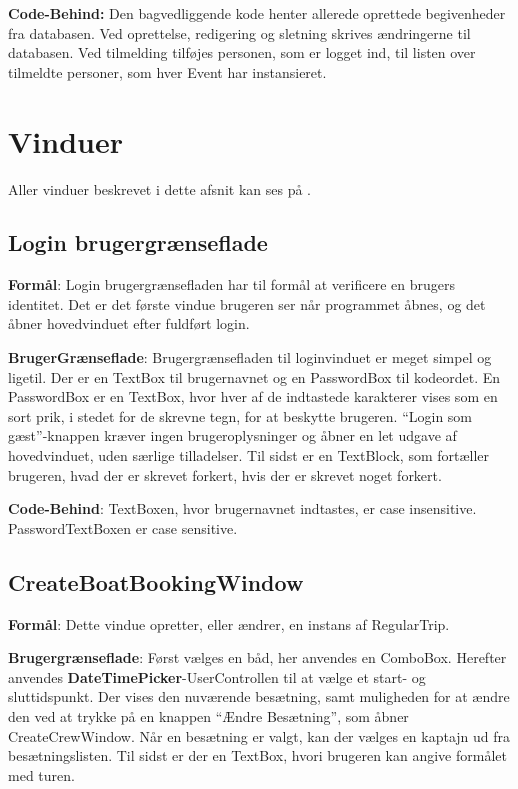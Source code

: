 \textbf{Code-Behind:}
Den bagvedliggende kode henter allerede oprettede begivenheder fra databasen. 
Ved oprettelse, redigering og sletning skrives ændringerne til databasen. 
Ved tilmelding tilføjes personen, som er logget ind, til listen over tilmeldte personer, som hver Event har instansieret. 

\section{Vinduer}
Aller vinduer beskrevet i dette afsnit kan ses på . 

\subsection{Login brugergrænseflade}
 
\textbf{Formål}:
Login brugergrænsefladen har til formål at verificere en brugers identitet. 
Det er det første vindue brugeren ser når programmet åbnes, og det åbner hovedvinduet efter fuldført login.
 
\textbf{BrugerGrænseflade}: 
Brugergrænsefladen til loginvinduet er meget simpel og ligetil. 
Der er en TextBox til brugernavnet og en PasswordBox til kodeordet.
En PasswordBox er en TextBox, hvor hver af de indtastede karakterer vises som en sort prik, i stedet for de skrevne tegn, for at beskytte brugeren.
``Login som gæst''-knappen kræver ingen brugeroplysninger og åbner en let udgave af hovedvinduet, uden særlige tilladelser.
Til sidst er en TextBlock, som fortæller brugeren, hvad der er skrevet forkert, hvis der er skrevet noget forkert.

\textbf{Code-Behind}: 
TextBoxen, hvor brugernavnet indtastes, er case insensitive.
PasswordTextBoxen er case sensitive. 

\subsection{CreateBoatBookingWindow}
\textbf{Formål}: 
Dette vindue opretter, eller ændrer, en instans af RegularTrip.

\textbf{Brugergrænseflade}: 
Først vælges en båd, her anvendes en ComboBox.
Herefter anvendes \textbf{DateTimePicker}-UserControllen til at vælge et start- og sluttidspunkt.
Der vises den nuværende besætning, samt muligheden for at ændre den ved at trykke på en knappen ``Ændre Besætning'', som åbner CreateCrewWindow.
Når en besætning er valgt, kan der vælges en kaptajn ud fra besætningslisten.
Til sidst er der en TextBox, hvori brugeren kan angive formålet med turen.

